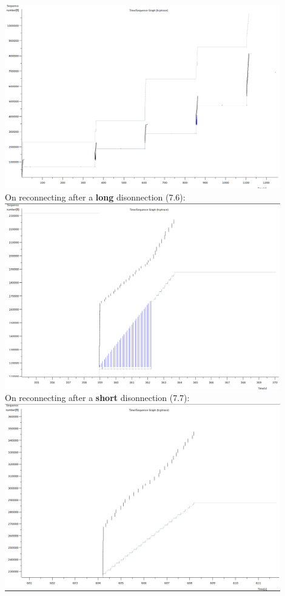   \centering
    \includegraphics[width=0.9\textwidth]{images/7.png}\\
    \newpage
On reconnecting after a \textbf{long} disonnection (7.6):\\
    \includegraphics[width=0.9\textwidth]{images/7_6.png}\\
On reconnecting after a \textbf{short} disonnection (7.7):\\
    \includegraphics[width=0.9\textwidth]{images/7_7.png}